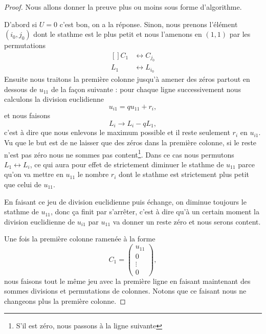 \begin{proof}
    Nous allons donner la preuve plus ou moins sous forme d'algorithme.

    D'abord si \( U=0\) c'est bon, on a la réponse. Sinon, nous prenons l'élément \( (i_0,j_0)\) dont le stathme est le plus petit et nous l'amenons en \( (1,1)\) par les permutations
    \begin{equation}
        \begin{aligned}[]
            C_1&\leftrightarrow C_{j_0}\\
            L_1&\leftrightarrow L_{i_0}
        \end{aligned}
    \end{equation}
    Ensuite nous traitons la première colonne jusqu'à amener des zéros partout en dessous de \( u_{11}\) de la façon suivante : pour chaque ligne successivement nous calculons la division euclidienne
    \begin{equation}
        u_{i1}=qu_{11}+r_i,
    \end{equation}
    et nous faisons
    \begin{equation}
        L_i\to L_i-qL_1,
    \end{equation}
    c'est à dire que nous enlevons le maximum possible et il reste seulement \( r_i\) en \( u_{i1}\). Vu que le but est de ne laisser que des zéros dans la première colonne, si le reste n'est pas zéro nous ne sommes pas content\footnote{S'il est zéro, nous passons à la ligne suivante}. Dans ce cas nous permutons \( L_1\leftrightarrow L_i\), ce qui aura pour effet de strictement diminuer le stathme de \( u_{11}\) parce qu'on va mettre en \( u_{11}\) le nombre \( r_i\) dont le stathme est strictement plus petit que celui de \( u_{11}\).

    En faisant ce jeu de division euclidienne puis échange, on diminue toujours le stathme de \( u_{11}\), donc ça finit par s'arrêter, c'est à dire qu'à un certain moment la division euclidienne de \( u_{i1}\) par \( u_{11}\) va donner un reste zéro et nous serons content.

    Une fois la première colonne ramenée à la forme
    \begin{equation}
        C_1=\begin{pmatrix}
            u_{11}    \\
            0    \\
            \vdots    \\
            0
        \end{pmatrix},
    \end{equation}
    nous faisons tout le même jeu avec la première ligne en faisant maintenant des sommes divisions et permutations de colonnes. Notons que ce faisant nous ne changeons plus la première colonne.


\end{proof}

